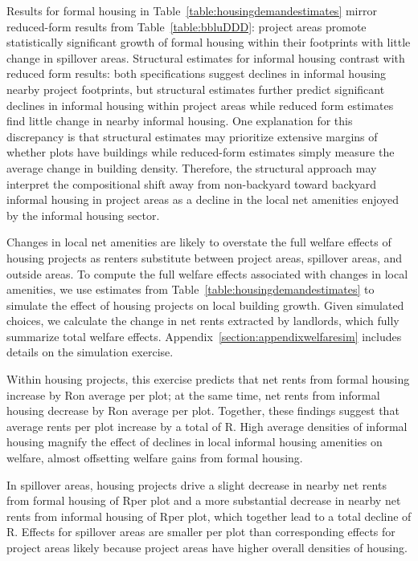 \documentclass[12pt]{article}
\begin{document}
Results for formal housing in Table~\ref{table:housingdemandestimates} mirror reduced-form results from Table~\ref{table:bbluDDD}:  project areas promote statistically significant growth of formal housing within their footprints with little change in spillover areas.  Structural estimates for informal housing contrast with reduced form results: both specifications suggest declines in informal housing nearby project footprints, but structural estimates further predict significant declines in informal housing within project areas while reduced form estimates find little change in nearby informal housing.  One explanation for this discrepancy is that structural estimates may prioritize extensive margins of whether plots have buildings while reduced-form estimates simply measure the average change in building density.  Therefore, the structural approach may interpret the compositional shift away from non-backyard toward backyard informal housing in project areas as a decline in the local net amenities enjoyed by the informal housing sector.

Changes in local net amenities are likely to overstate the full welfare effects of housing projects as renters substitute between project areas, spillover areas, and outside areas.  To compute the full welfare effects associated with changes in local amenities, we use estimates from Table~\ref{table:housingdemandestimates} to simulate the effect of housing projects on local building growth.  Given simulated choices, we calculate the change in net rents extracted by landlords, which fully summarize total welfare effects.  Appendix~\ref{section:appendixwelfaresim} includes details on the simulation exercise.

Within housing projects, this exercise predicts that net rents from formal housing increase by Ron average per plot; at the same time, net rents from informal housing decrease by Ron average per plot.  Together, these findings suggest that average rents per plot increase by a total of R\unskip. High average densities of informal housing magnify the effect of declines in local informal housing amenities on welfare, almost offsetting welfare gains from formal housing.

In spillover areas, housing projects drive a slight decrease in nearby net rents from formal housing of Rper plot and a more substantial decrease in nearby net rents from informal housing of Rper plot, which together lead to a total decline of R\unskip.  Effects for spillover areas are smaller per plot than corresponding effects for project areas likely because project areas have higher overall densities of housing.
\end{document}

